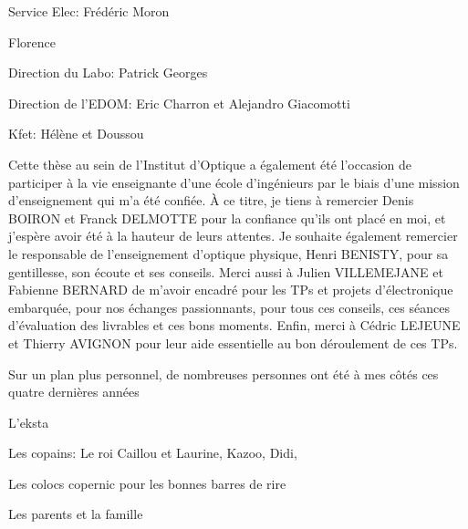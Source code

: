 Service Elec: Frédéric Moron

Florence

Direction du Labo: Patrick Georges

Direction de l'EDOM: Eric Charron et Alejandro Giacomotti

Kfet: Hélène et Doussou



Cette thèse au sein de l'Institut d'Optique a également été l'occasion de participer à la vie enseignante d'une école d'ingénieurs par le biais d'une mission d'enseignement qui m'a été confiée. À ce titre, je tiens à remercier Denis BOIRON et Franck DELMOTTE pour la confiance qu'ils ont placé en moi, et j'espère avoir été à la hauteur de leurs attentes. Je souhaite également remercier le responsable de l'enseignement d'optique physique, Henri BENISTY, pour sa gentillesse, son écoute et ses conseils. Merci aussi à Julien VILLEMEJANE et Fabienne BERNARD de m'avoir encadré pour les TPs et projets d'électronique embarquée, pour nos échanges passionnants, pour tous ces conseils, ces séances d'évaluation des livrables et ces bons moments. Enfin, merci à Cédric LEJEUNE et Thierry AVIGNON pour leur aide essentielle au bon déroulement de ces TPs.

Sur un plan plus personnel, de nombreuses personnes ont été à mes côtés ces quatre dernières années


L'eksta

Les copains: Le roi Caillou et Laurine, Kazoo, Didi, 

Les colocs copernic pour les bonnes barres de rire

Les parents et la famille




